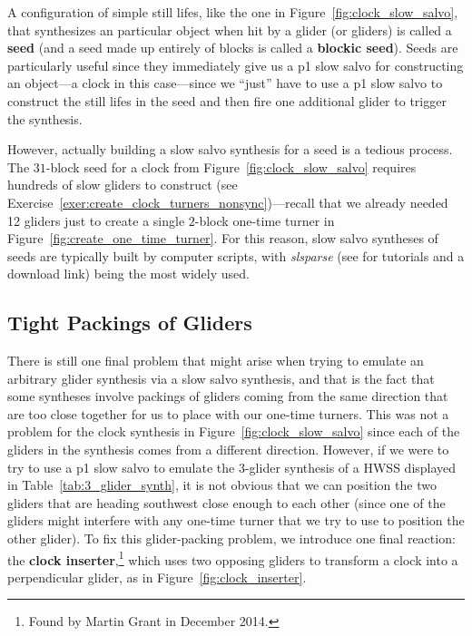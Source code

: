 A configuration of simple still lifes, like the one in Figure~\ref{fig:clock_slow_salvo}, that synthesizes an particular object when hit by a glider (or gliders) is called a \textbf{seed} (and a seed made up entirely of blocks is called a \textbf{blockic seed}). Seeds are particularly useful since they immediately give us a p1 slow salvo for constructing an object---a clock in this case---since we ``just'' have to use a p1 slow salvo to construct the still lifes in the seed and then fire one additional glider to trigger the synthesis.

However, actually building a slow salvo synthesis for a seed is a tedious process. The $31$-block seed for a clock from Figure~\ref{fig:clock_slow_salvo} requires hundreds of slow gliders to construct (see Exercise~\ref{exer:create_clock_turners_nonsync})---recall that we already needed 12 gliders just to create a single $2$-block one-time turner in Figure~\ref{fig:create_one_time_turner}. For this reason, slow salvo syntheses of seeds are typically built by computer scripts, with \emph{slsparse} (see  for tutorials and a download link) being the most widely used.%


\subsection{Tight Packings of Gliders}\label{sec:slow_salvo_tight}

There is still one final problem that might arise when trying to emulate an arbitrary glider synthesis via a slow salvo synthesis, and that is the fact that some syntheses involve packings of gliders coming from the same direction that are too close together for us to place with our one-time turners. This was not a problem for the clock synthesis in Figure~\ref{fig:clock_slow_salvo} since each of the gliders in the synthesis comes from a different direction. However, if we were to try to use a p1 slow salvo to emulate the 3-glider synthesis of a HWSS displayed in Table~\ref{tab:3_glider_synth}, it is not obvious that we can position the two gliders that are heading southwest close enough to each other (since one of the gliders might interfere with any one-time turner that we try to use to position the other glider). To fix this glider-packing problem, we introduce one final reaction: the \textbf{clock inserter},\footnote{Found by Martin Grant in December 2014.} which uses two opposing gliders to transform a clock into a perpendicular glider, as in Figure~\ref{fig:clock_inserter}.

